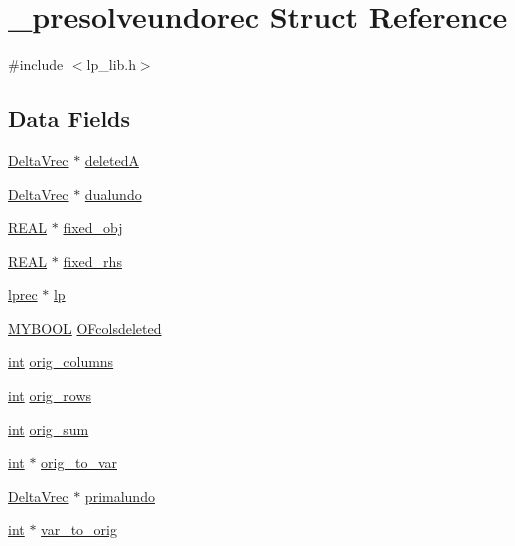 \hypertarget{struct__presolveundorec}{}\section{\+\_\+presolveundorec Struct Reference}
\label{struct__presolveundorec}


{\ttfamily \#include $<$lp\+\_\+lib.\+h$>$}

\subsection*{Data Fields}
\begin{DoxyCompactItemize}
\item 
\hyperlink{lp__matrix_8h_ad2fc3f0ece09bd21c244ef3657a0feb1}{Delta\+Vrec} $\ast$ \hyperlink{struct__presolveundorec_a5fe9a6f40d5ac1e6983ecc023298b03e}{deletedA}
\item 
\hyperlink{lp__matrix_8h_ad2fc3f0ece09bd21c244ef3657a0feb1}{Delta\+Vrec} $\ast$ \hyperlink{struct__presolveundorec_a2a29f0a755a86665044ac6367556bfe8}{dualundo}
\item 
\hyperlink{lp__lib_8h_a92bd5e363d131fa73669358edb232dce}{R\+E\+AL} $\ast$ \hyperlink{struct__presolveundorec_af2f9c7feb38feef481f70931fbcf4753}{fixed\+\_\+obj}
\item 
\hyperlink{lp__lib_8h_a92bd5e363d131fa73669358edb232dce}{R\+E\+AL} $\ast$ \hyperlink{struct__presolveundorec_aa9b76696ab6d3a50285fb16c9c5ce1f6}{fixed\+\_\+rhs}
\item 
\hyperlink{lp__types_8h_afe42f1373b9ee8d824b5cad6a22d24c6}{lprec} $\ast$ \hyperlink{struct__presolveundorec_a18da9d1a438639715327ff16fc0f7a8c}{lp}
\item 
\hyperlink{lp__lib_8h_aad848328fb3018217ac9f01d97b6bd88}{M\+Y\+B\+O\+OL} \hyperlink{struct__presolveundorec_aed7a8ce8c459a410226c0462406dd2b9}{O\+Fcolsdeleted}
\item 
\hyperlink{lp__lib_8h_adeb9ec6400320e4923ac9d836d509ddb}{int} \hyperlink{struct__presolveundorec_af06aa77578d46f479a3d2e1674f39c41}{orig\+\_\+columns}
\item 
\hyperlink{lp__lib_8h_adeb9ec6400320e4923ac9d836d509ddb}{int} \hyperlink{struct__presolveundorec_ab869b8e20446b8d33314f8bfdfe5361d}{orig\+\_\+rows}
\item 
\hyperlink{lp__lib_8h_adeb9ec6400320e4923ac9d836d509ddb}{int} \hyperlink{struct__presolveundorec_a452299919c0963d014f6fe63e521de45}{orig\+\_\+sum}
\item 
\hyperlink{lp__lib_8h_adeb9ec6400320e4923ac9d836d509ddb}{int} $\ast$ \hyperlink{struct__presolveundorec_a958bff3f3f49714baabe0810a7ea7fae}{orig\+\_\+to\+\_\+var}
\item 
\hyperlink{lp__matrix_8h_ad2fc3f0ece09bd21c244ef3657a0feb1}{Delta\+Vrec} $\ast$ \hyperlink{struct__presolveundorec_acf746e53a79e2662028bcf6ea43a31a1}{primalundo}
\item 
\hyperlink{lp__lib_8h_adeb9ec6400320e4923ac9d836d509ddb}{int} $\ast$ \hyperlink{struct__presolveundorec_a0620fdf4994350060fea0eb3e0d5c181}{var\+\_\+to\+\_\+orig}
\end{DoxyCompactItemize}


